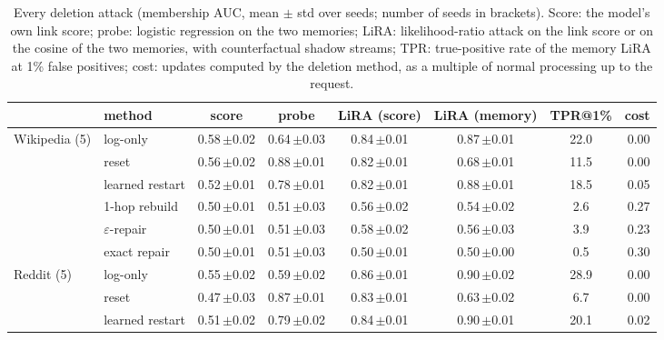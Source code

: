 \begin{table}[!htb]
\centering\scriptsize
\caption{Every deletion attack (membership AUC, mean $\pm$ std over seeds; number of seeds in brackets). Score: the model's
own link score; probe: logistic regression on the two memories; LiRA: likelihood-ratio attack on the link score or on the
cosine of the two memories, with counterfactual shadow streams; TPR: true-positive rate of the memory LiRA at 1\% false
positives; cost: updates computed by the deletion method, as a multiple of normal processing up to the request.}
\label{tab:delfull}
\setlength{\tabcolsep}{4pt}
\begin{tabular}{@{}llcccccr@{}}
\toprule
 & method & score & probe & LiRA (score) & LiRA (memory) & TPR@1\% & cost \\
\midrule
Wikipedia (5) & log-only & 0.58\,{\scriptsize$\pm$0.02} & 0.64\,{\scriptsize$\pm$0.03} & 0.84\,{\scriptsize$\pm$0.01} & 0.87\,{\scriptsize$\pm$0.01} & 22.0 & 0.00 \\
 & reset & 0.56\,{\scriptsize$\pm$0.02} & 0.88\,{\scriptsize$\pm$0.01} & 0.82\,{\scriptsize$\pm$0.01} & 0.68\,{\scriptsize$\pm$0.01} & 11.5 & 0.00 \\
 & learned restart & 0.52\,{\scriptsize$\pm$0.01} & 0.78\,{\scriptsize$\pm$0.01} & 0.82\,{\scriptsize$\pm$0.01} & 0.88\,{\scriptsize$\pm$0.01} & 18.5 & 0.05 \\
 & 1-hop rebuild & 0.50\,{\scriptsize$\pm$0.01} & 0.51\,{\scriptsize$\pm$0.03} & 0.56\,{\scriptsize$\pm$0.02} & 0.54\,{\scriptsize$\pm$0.02} & 2.6 & 0.27 \\
 & $\varepsilon$-repair & 0.50\,{\scriptsize$\pm$0.01} & 0.51\,{\scriptsize$\pm$0.03} & 0.58\,{\scriptsize$\pm$0.02} & 0.56\,{\scriptsize$\pm$0.03} & 3.9 & 0.23 \\
 & exact repair & 0.50\,{\scriptsize$\pm$0.01} & 0.51\,{\scriptsize$\pm$0.03} & 0.50\,{\scriptsize$\pm$0.01} & 0.50\,{\scriptsize$\pm$0.00} & 0.5 & 0.30 \\
\midrule
Reddit (5) & log-only & 0.55\,{\scriptsize$\pm$0.02} & 0.59\,{\scriptsize$\pm$0.02} & 0.86\,{\scriptsize$\pm$0.01} & 0.90\,{\scriptsize$\pm$0.02} & 28.9 & 0.00 \\
 & reset & 0.47\,{\scriptsize$\pm$0.03} & 0.87\,{\scriptsize$\pm$0.01} & 0.83\,{\scriptsize$\pm$0.01} & 0.63\,{\scriptsize$\pm$0.02} & 6.7 & 0.00 \\
 & learned restart & 0.51\,{\scriptsize$\pm$0.02} & 0.79\,{\scriptsize$\pm$0.02} & 0.84\,{\scriptsize$\pm$0.01} & 0.90\,{\scriptsize$\pm$0.01} & 20.1 & 0.02 \\

\end{tabular}
\end{table}
